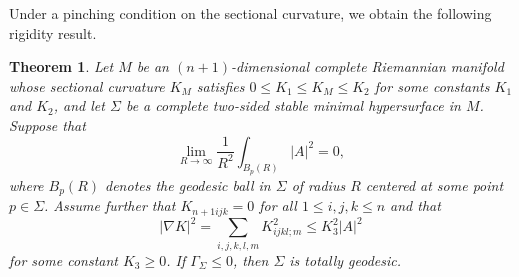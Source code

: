 \documentclass[amssymb,amstex,amsmath,11pt]{article}
\numberwithin{equation}{section}
\theoremstyle{plain}
\newtheorem{thm}{Theorem}[section]
\theoremstyle{definition}
\theoremstyle{remark}
\begin{document}
Under a pinching condition on the sectional curvature, we obtain the following rigidity result.

\begin{thm}\label{thmftc1}
Let $M$ be an $(n+1)$-dimensional complete Riemannian manifold whose sectional curvature $K_M$ satisfies $0\le K_1\le K_M\le K_2$ for some constants $K_1$ and $K_2$, and let $\Sigma$ be a complete two-sided stable minimal hypersurface in $M$. Suppose that
$$
\lim_{R\to\infty}\frac{1}{R^2}\int_{B_p(R)}|A|^2=0,
$$
where $B_p(R)$ denotes the geodesic ball in $\Sigma$ of radius $R$ centered at some point $p\in \Sigma$. Assume further that $K_{n+1ijk}=0$ for all $1\le i,j,k\le n$ and that
$$
|\nabla K|^2=\sum_{i,j,k,l,m}K_{ijkl;m}^2\le K_3^2|A|^2
$$
for some constant $K_3\ge 0$. If $\Gamma_\Sigma\le 0$, then $\Sigma$ is totally geodesic.
\end{thm}
\end{document}
